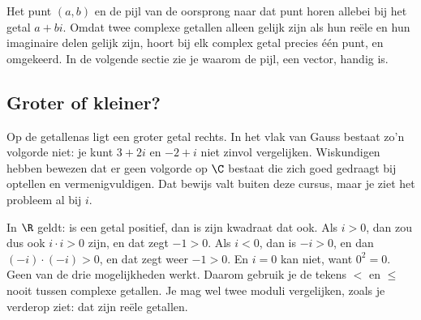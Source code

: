 Het punt $(a, b)$ en de pijl van de oorsprong naar dat punt horen allebei bij het getal $a + bi$. Omdat twee complexe getallen alleen gelijk zijn als hun reële en hun imaginaire delen gelijk zijn, hoort bij elk complex getal precies één punt, en omgekeerd. In de volgende sectie zie je waarom de pijl, een vector, handig is.


\begin{oefeningen}
\end{oefeningen}

\subsection{Groter of kleiner?}

Op de getallenas ligt een groter getal rechts. In het vlak van Gauss bestaat zo'n volgorde niet: je kunt $3 + 2i$ en $-2 + i$ niet zinvol vergelijken. Wiskundigen hebben bewezen dat er geen volgorde op $\C$ bestaat die zich goed gedraagt bij optellen en vermenigvuldigen. Dat bewijs valt buiten deze cursus, maar je ziet het probleem al bij $i$.

In $\R$ geldt: is een getal positief, dan is zijn kwadraat dat ook. Als $i > 0$, dan zou dus ook $i \cdot i > 0$ zijn, en dat zegt $-1 > 0$. Als $i < 0$, dan is $-i > 0$, en dan $(-i) \cdot (-i) > 0$, en dat zegt weer $-1 > 0$. En $i = 0$ kan niet, want $0^2 = 0$. Geen van de drie mogelijkheden werkt. Daarom gebruik je de tekens $<$ en $\leqslant$ nooit tussen complexe getallen. Je mag wel twee moduli vergelijken, zoals je verderop ziet: dat zijn reële getallen.

